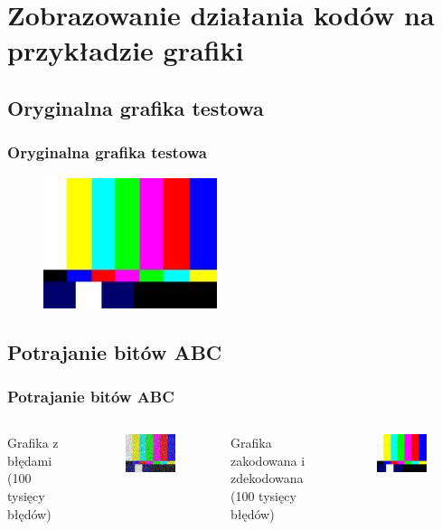 \documentclass{beamer}
\begin{document}
\section{Zobrazowanie działania kodów na przykładzie grafiki}
\subsection{Oryginalna grafika testowa}
\begin{frame}
    \frametitle{Oryginalna grafika testowa}
    \begin{figure}
        \centering
        \includegraphics[scale=4]{zdjecia/image.jpg}
    \end{figure}
\end{frame}


\subsection{Potrajanie bitów ABC}

\begin{frame}
\frametitle{Potrajanie bitów ABC}
\begin{columns}[c]
    \tiny
    Grafika z błędami (100 tysięcy błędów) 
    \begin{figure}
        \includegraphics[scale=0.5]{zdjecia/grafika 100k bledow.jpg}
    \end{figure}
    
    \tiny
    Grafika zakodowana i zdekodowana (100 tysięcy błędów)
    \begin{figure}
        \includegraphics[scale=0.5]{zdjecia/grafika 100k bledow tripling.jpg}
    \end{figure}
\end{columns}
\end{frame}
\end{document}
